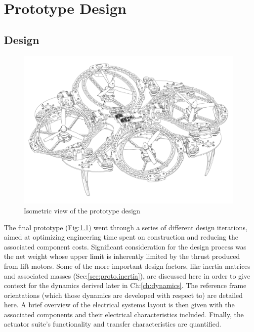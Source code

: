 \chapter{Prototype Design}
\label{ch:proto}
\section{Design}
\label{sec:proto.design}
\begin{figure}[htbp]
\centering
\includegraphics[width=\textwidth]{pdfpages/iso-design.pdf}
\vspace{-34pt}
\caption{Isometric view of the prototype design}
\vspace{-4pt}
\label{fig:iso-design}
\end{figure}
\par
The final prototype (Fig:\ref{fig:iso-design}) went through a series of different design iterations, aimed at optimizing engineering time spent on construction and reducing the associated component costs. Significant consideration for the design process was the net weight whose upper limit is inherently limited by the thrust produced from lift motors. Some of the more important design factors, like inertia matrices and associated masses (Sec:\ref{sec:proto.inertia}), are discussed here in order to give context for the dynamics derived later in Ch:\ref{ch:dynamics}. The reference frame orientations (which those dynamics are developed with respect to) are detailed here. A brief overview of the electrical systems layout is then given with the associated components and their electrical characteristics included. Finally, the actuator suite's functionality and transfer characteristics are quantified.
